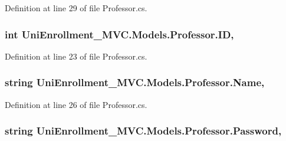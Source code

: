 Definition at line 29 of file Professor.\+cs.

\subsubsection[{\texorpdfstring{ID}{ID}}]{\setlength{\rightskip}{0pt plus 5cm}int Uni\+Enrollment\+\_\+\+M\+V\+C.\+Models.\+Professor.\+ID\hspace{0.3cm}{\ttfamily [get]}, {\ttfamily [set]}}\hypertarget{class_uni_enrollment___m_v_c_1_1_models_1_1_professor_a523e3b2481013fa4ca07e284b43b58e8}{}\label{class_uni_enrollment___m_v_c_1_1_models_1_1_professor_a523e3b2481013fa4ca07e284b43b58e8}


Definition at line 23 of file Professor.\+cs.

\subsubsection[{\texorpdfstring{Name}{Name}}]{\setlength{\rightskip}{0pt plus 5cm}string Uni\+Enrollment\+\_\+\+M\+V\+C.\+Models.\+Professor.\+Name\hspace{0.3cm}{\ttfamily [get]}, {\ttfamily [set]}}\hypertarget{class_uni_enrollment___m_v_c_1_1_models_1_1_professor_a35954cde0d15842398954fcfcb574def}{}\label{class_uni_enrollment___m_v_c_1_1_models_1_1_professor_a35954cde0d15842398954fcfcb574def}


Definition at line 26 of file Professor.\+cs.

\subsubsection[{\texorpdfstring{Password}{Password}}]{\setlength{\rightskip}{0pt plus 5cm}string Uni\+Enrollment\+\_\+\+M\+V\+C.\+Models.\+Professor.\+Password\hspace{0.3cm}{\ttfamily [get]}, {\ttfamily [set]}}\hypertarget{class_uni_enrollment___m_v_c_1_1_models_1_1_professor_ab22587d825d96c35e5e0eb628d51f3d0}{}\label{class_uni_enrollment___m_v_c_1_1_models_1_1_professor_ab22587d825d96c35e5e0eb628d51f3d0}


